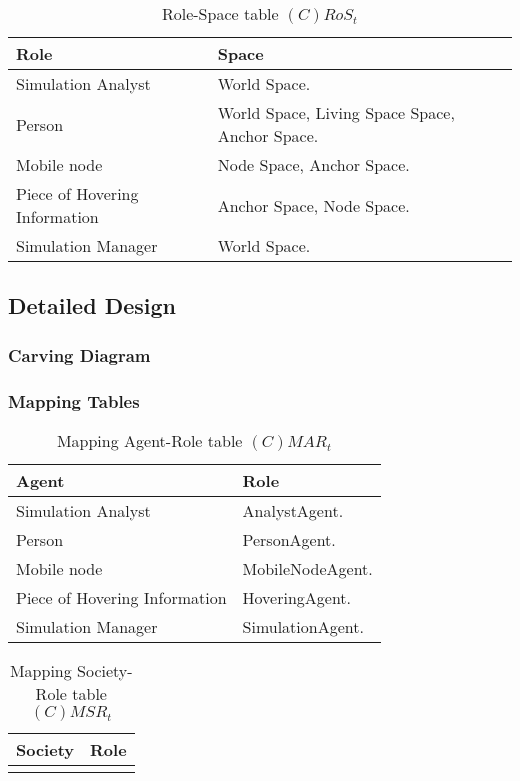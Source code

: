 \begin{table}[H]
	\centering
	\begin{tabular}{|p{4cm}|p{8cm}|}
			\hline
			\textbf{Role} & \textbf{Space} \\
			\hline
			Simulation Analyst & World Space. \\
			\hline
			Person & World Space, Living Space Space, Anchor Space. \\
			\hline
			Mobile node & Node Space, Anchor Space. \\
			\hline
			Piece of Hovering Information & Anchor Space, Node Space. \\
			\hline
			Simulation Manager & World Space. \\
			\hline
		\end{tabular}
	\caption{Role-Space table $(C)RoS_t$}
	\label{tab:cost}
\end{table}

\subsection{Detailed Design}

\subsubsection{Carving Diagram}


\subsubsection{Mapping Tables}

\begin{table}[H]
	\centering
	\begin{tabular}{|p{4cm}|p{8cm}|}
			\hline
			\textbf{Agent} & \textbf{Role} \\
			\hline
			Simulation Analyst & AnalystAgent. \\
			\hline
			Person & PersonAgent. \\
			\hline
			Mobile node & MobileNodeAgent.  \\
			\hline
			Piece of Hovering Information & HoveringAgent. \\
			\hline
			Simulation Manager & SimulationAgent. \\
			\hline
		\end{tabular}
	\caption{Mapping Agent-Role table $(C)MAR_t$}
	\label{tab:cmart}
\end{table}

\begin{table}[H]
	\centering
	\begin{tabular}{|p{4cm}|p{8cm}|}
			\hline
			\textbf{Society} & \textbf{Role} \\
			\hline
			& \\
			\hline
		\end{tabular}
	\caption{Mapping Society-Role table $(C)MSR_t$}
	\label{tab:cmsrt}
\end{table}

